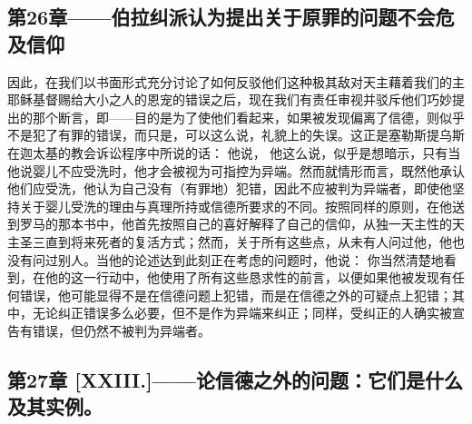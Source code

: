 
\subsection{第26章——伯拉纠派认为提出关于原罪的问题不会危及信仰}

因此，在我们以书面形式充分讨论了如何反驳他们这种极其敌对天主藉着我们的主耶稣基督赐给大小之人的恩宠的错误之后，现在我们有责任审视并驳斥他们巧妙提出的那个断言，即——目的是为了使他们看起来，如果被发现偏离了信德，则似乎不是犯了有罪的错误，而只是，可以这么说，礼貌上的失误。这正是塞勒斯提乌斯在迦太基的教会诉讼程序中所说的话： 他说， 他这么说，似乎是想暗示，只有当他说婴儿不应受洗时，他才会被视为可指控为异端。然而就情形而言，既然他承认他们应受洗，他认为自己没有（有罪地）犯错，因此不应被判为异端者，即使他坚持关于婴儿受洗的理由与真理所持或信德所要求的不同。按照同样的原则，在他送到罗马的那本书中，他首先按照自己的喜好解释了自己的信仰，从独一天主性的天主圣三直到将来死者的复活方式；然而，关于所有这些点，从未有人问过他，他也没有问过别人。当他的论述达到此刻正在考虑的问题时，他说： 你当然清楚地看到，在他的这一行动中，他使用了所有这些恳求性的前言，以便如果他被发现有任何错误，他可能显得不是在信德问题上犯错，而是在信德之外的可疑点上犯错；其中，无论纠正错误多么必要，但不是作为异端来纠正；同样，受纠正的人确实被宣告有错误，但仍然不被判为异端者。\par


\subsection{第27章 [XXIII.]——论信德之外的问题：它们是什么及其实例。}

